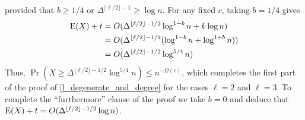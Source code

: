 \documentclass{patmorin}
\begin{document}
provided that $b\ge 1/4$ or $\Delta^{\lfloor\ell/2\rfloor-1}\ge\log n$.
For any fixed $c$, taking $b=1/4$ gives
\begin{align*}
  \mathrm{E}(X)+t
    & = O(\Delta^{\lfloor\ell/2\rfloor-1/2}\log^{1-b} n + k\log n) \\
    & = O(\Delta^{\lfloor\ell/2\rfloor-1/2}(\log^{1-b} n + \log^{1+b} n)) \\
    & = O(\Delta^{\lfloor\ell/2\rfloor-1/2}\log^{5/4} n)
\end{align*}
Thus, $\Pr(X\ge \Delta^{\lfloor\ell/2\rfloor-1/2}\log^{5/4} n) \le n^{-\Omega(c)}$, which completes the first part of the proof of \cref{l_degenerate_and_degree} for the cases $\ell=2$ and $\ell=3$.  To complete the ``furthermore'' clause of the proof we take $b=0$ and deduce that $\mathrm{E}(X)+t=O(\Delta^{\lfloor\ell/2\rfloor-1/2}\log n)$.





\end{document}
